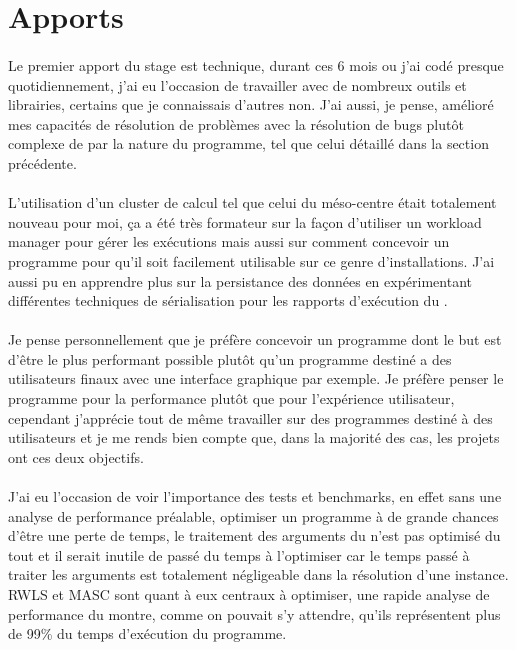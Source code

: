 \documentclass[a4paper,11pt,twoside,french,report]{../common/simplem}
\begin{document}
		\section{Apports}
			\paragraph*{}
				Le premier apport du stage est technique, durant ces 6 mois ou j'ai codé presque quotidiennement, j'ai eu l'occasion de travailler avec de nombreux outils et librairies, certains que je connaissais d'autres non. J'ai aussi, je pense, amélioré mes capacités de résolution de problèmes avec la résolution de bugs plutôt complexe de par la nature du programme, tel que celui détaillé dans la section précédente.
			\paragraph*{}
				L'utilisation d'un cluster de calcul tel que celui du méso-centre était totalement nouveau pour moi, ça a été très formateur sur la façon d'utiliser un workload manager pour gérer les exécutions mais aussi sur comment concevoir un programme pour qu'il soit facilement utilisable sur ce genre d'installations. J'ai aussi pu en apprendre plus sur la persistance des données en expérimentant différentes techniques de sérialisation pour les rapports d'exécution du \solver{}.
			\paragraph*{}
				Je pense personnellement que je préfère concevoir un programme dont le but est d'être le plus performant possible plutôt qu'un programme destiné a des utilisateurs finaux avec une interface graphique par exemple. Je préfère penser le programme pour la performance plutôt que pour l'expérience utilisateur, cependant j'apprécie tout de même travailler sur des programmes destiné à des utilisateurs et je me rends bien compte que, dans la majorité des cas, les projets ont ces deux objectifs.
			\paragraph*{}
				J'ai eu l'occasion de voir l'importance des tests et benchmarks, en effet sans une analyse de performance préalable, optimiser un programme à de grande chances d'être une perte de temps, le traitement des arguments du \solver{} n'est pas optimisé du tout et il serait inutile de passé du temps à l'optimiser car le temps passé à traiter les arguments est totalement négligeable dans la résolution d'une instance. \gls{RWLS} et \gls{MASC} sont quant à eux centraux à optimiser, une rapide analyse de performance du \solver{} montre, comme on pouvait s'y attendre, qu'ils représentent plus de 99\% du temps d'exécution du programme.
\end{document}
